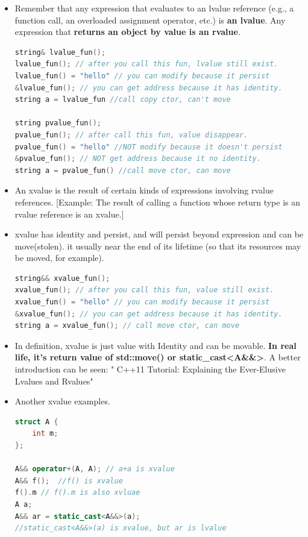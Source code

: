 \documentclass[a4paper,12pt,twoside]{book}
\begin{document}
\begin{itemize}

\item Remember that any expression that evaluates to an lvalue reference (e.g., a function call, an overloaded assignment operator, etc.) is \textbf{an lvalue}. Any expression that \textbf{returns an object by value is an rvalue}.

\begin{lstlisting}[frame=single, language=c++, mathescape=true]
string& lvalue_fun();
lvalue_fun(); // after you call this fun, lvalue still exist.
lvalue_fun() = "hello" // you can modify because it persist
&lvalue_fun(); // you can get address because it has identity.
string a = lvalue_fun //call copy ctor, can't move

string pvalue_fun();
pvalue_fun(); // after call this fun, value disappear.
pvalue_fun() = "hello" //NOT modify because it doesn't persist
&pvalue_fun(); // NOT get address because it no identity.
string a = pvalue_fun() //call move ctor, can move
\end{lstlisting}

\item An xvalue is the result of certain kinds of expressions involving rvalue references. [Example: The result of calling a function whose return type is an rvalue reference is an xvalue.]

\item xvalue has identity and persist, and will persist beyond expression and can be move(stolen). it usually near the end of its lifetime (so that its resources may be moved, for example).
\begin{lstlisting}[frame=single, language=c++, mathescape=true]
string&& xvalue_fun();
xvalue_fun(); // after you call this fun, value still exist.
xvalue_fun() = "hello" // you can modify because it persist
&xvalue_fun(); // you can get address because it has identity.
string a = xvalue_fun(); // call move ctor, can move
\end{lstlisting}

\item In definition,  xvalue is just value with Identity and can be movable. \textbf{In real life, it's  return value of std::move() or static\_cast<A\&\&>}. A better introduction can be seen: " C++11 Tutorial: Explaining the Ever-Elusive Lvalues and Rvalues"

\item Another xvalue examples.
\begin{lstlisting}[frame=single, language=c++]
struct A {
    int m;
};

A&& operator+(A, A); // a+a is xvalue
A&& f();  //f() is xvalue
f().m // f().m is also xvluae
A a;
A&& ar = static_cast<A&&>(a);
//static_cast<A&&>(a) is xvalue, but ar is lvalue
\end{lstlisting}


\end{itemize}
\end{document}
